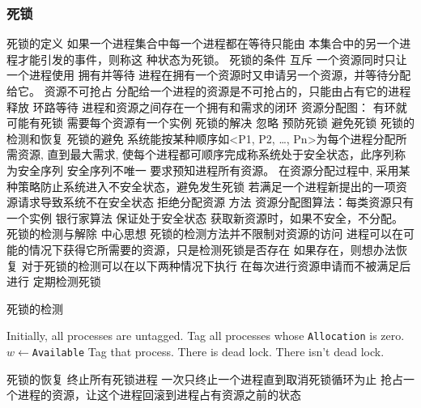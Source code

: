 \documentclass{ctexart}
\begin{document}
\subsubsection{死锁}
\begin{outline}
    \1 死锁的定义
        \2  如果一个进程集合中每一个进程都在等待只能由 本集合中的另一个进程才能引发的事件，则称这 种状态为死锁。
    \1 死锁的条件
        \2 互斥
            \3 一个资源同时只让一个进程使用
        \2拥有并等待
            \3 进程在拥有一个资源时又申请另一个资源，并等待分配给它。
        \2 资源不可抢占
            \3 分配给一个进程的资源是不可抢占的，只能由占有它的进程释放
        \2 环路等待
            \3 进程和资源之间存在一个拥有和需求的闭环
    \1 资源分配图：
        \2 有环就可能有死锁
        \2 需要每个资源有一个实例
    \1 死锁的解决
        \2 忽略
        \2 预防死锁
        \2 避免死锁
        \2 死锁的检测和恢复
    \1 死锁的避免
    系统能按某种顺序如<P1, P2, …, Pn>为每个进程分配所需资源,
    直到最大需求, 使每个进程都可顺序完成称系统处于安全状态，此序列称为安全序列
        \2 安全序列不唯一
        \2 要求预知进程所有资源。
            \3 在资源分配过程中, 采用某种策略防止系统进入不安全状态，避免发生死锁
            \3 若满足一个进程新提出的一项资源请求导致系统不在安全状态拒绝分配资源
            \3 方法
                \4 资源分配图算法：每类资源只有一个实例
                \4 银行家算法
                    \4 保证处于安全状态
                    \4 获取新资源时，如果不安全，不分配。
    \1 死锁的检测与解除
        \2 中心思想
            \3死锁的检测方法并不限制对资源的访问
            \3进程可以在可能的情况下获得它所需要的资源，只是检测死锁是否存在
            \3如果存在，则想办法恢复
        \2对于死锁的检测可以在以下两种情况下执行
            \3在每次进行资源申请而不被满足后进行
            \3定期检测死锁
            \begin{algorithm}[H]
                \caption{死锁的检测}
                \begin{algorithmic}[1]
                    \State Initially, all processes are untagged.
                    \State Tag all processes whose \verb|Allocation| is zero.
                    \State $w \gets $\verb|Available|
                        \State Tag that process.
                    \EndWhile
                        \State There is dead lock.
                    \Else
                        \State There isn't dead lock.
                    \EndIf
                \end{algorithmic}
            \end{algorithm}
        \2 死锁的恢复
            \3 终止所有死锁进程
            \3 一次只终止一个进程直到取消死锁循环为止
            \3 抢占一个进程的资源，让这个进程回滚到进程占有资源之前的状态
        

\end{outline}
\end{document}
